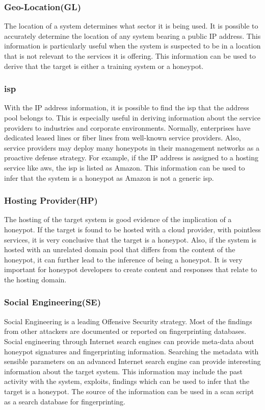 \subsubsection{Geo-Location(GL)}
The location of a system determines what sector it is being used. It is possible to accurately determine the location of any system bearing a public IP address. This information is particularly useful when the system is suspected to be in a location that is not relevant to the services it is offering. This information can be used to derive that the target is either a training system or a honeypot. 

\subsubsection{\acrfull{isp}}
With the IP address information, it is possible to find the \acrshort{isp} that the address pool belongs to. This is especially useful in deriving information about the service providers to industries and corporate environments. Normally, enterprises have dedicated leased lines or fiber lines from well-known service providers. Also, service providers may deploy many honeypots in their management networks as a proactive defense strategy. For example, if the IP address is assigned to a hosting service like \acrshort{aws}, the \acrshort{isp} is listed as Amazon. This information can be used to infer that the system is a honeypot as Amazon is not a generic \acrshort{isp}. 

\subsubsection{Hosting Provider(HP)}
The hosting of the target system is good evidence of the implication of a honeypot. If the target is found to be hosted with a cloud provider, with pointless services, it is very conclusive that the target is a honeypot. Also, if the system is hosted with an unrelated domain pool that differs from the content of the honeypot, it can further lead to the inference of being a honeypot. It is very important for honeypot developers to create content and responses that relate to the hosting domain. 

\subsubsection{Social Engineering(SE)}
Social Engineering is a leading Offensive Security strategy. Most of the findings from other attackers are documented or reported on fingerprinting databases. Social engineering through Internet search engines can provide meta-data about honeypot signatures and fingerprinting information. Searching the metadata with sensible parameters on an advanced Internet search engine can provide interesting information about the target system. This information may include the past activity with the system, exploits, findings which can be used to infer that the target is a honeypot. The source of the information can be used in a scan script as a search database for fingerprinting. 

